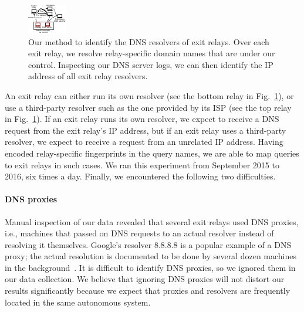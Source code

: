 \begin{figure}[t]
	\centering
	\includegraphics[width=0.8\linewidth]{figures/resolver-identification.pdf}
	\caption{Our method to identify the DNS resolvers of exit relays.  Over each
	exit relay, we resolve relay-specific domain names that are under our control.
	Inspecting our DNS server logs, we can then identify the IP address of all
	exit relay resolvers.}
	\label{fig:dnsenum}
\end{figure}

An exit relay can either run its own resolver (see the bottom relay in
Fig.~\ref{fig:dnsenum}), or use a third-party resolver such as the one provided
by its ISP (see the top relay in Fig.~\ref{fig:dnsenum}).  If an exit relay runs
its own resolver, we expect to receive a DNS request from the exit relay's IP
address, but if an exit relay uses a third-party resolver, we expect to receive
a request from an unrelated IP address.  Having encoded relay-specific
fingerprints in the query names, we are able to map queries to exit relays in
such cases.  We ran this experiment from September 2015 to \fixme{} 2016, six
times a day.  Finally, we encountered the following two difficulties.

\paragraph{DNS proxies}
Manual inspection of our data revealed that several exit relays used DNS
proxies, i.e., machines that passed on DNS requests to an actual resolver
instead of resolving it themselves.  Google's resolver 8.8.8.8 is a popular
example of a DNS proxy; the actual resolution is documented to be done by
several dozen machines in the background~\cite{google-proxies}.  It is
difficult to identify DNS proxies, so we ignored them in our data collection.
We believe that ignoring DNS proxies will not distort our results significantly
because we expect that proxies and resolvers are frequently located in the same
autonomous system.

